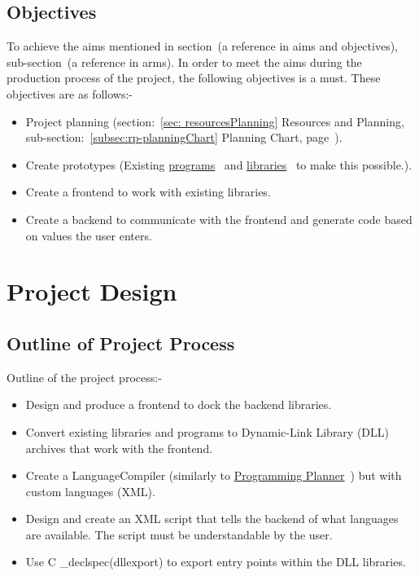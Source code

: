 \documentclass[conference]{IEEEtran}
\begin{document}
      \subsection{Objectives}
        To achieve the aims mentioned in section~(a reference in aims and objectives), sub-section~(a reference in arms). In order to meet the aims during the production process of the project, the following objectives is a must. These objectives are as follows:-
        \begin{itemize}
          \item Project planning (section:~\ref{sec: resourcesPlanning} Resources and Planning, sub-section:~\ref{subsec:rp-planningChart} Planning Chart, page~\pageref{subsec:rp-planningChart}).
          \item Create prototypes (Existing \href{https://github.com/ShinkuKira21/VisualPro-FinalProject/tree/main/Experience}{programs}~\cite{patch_programming_2021} and \href{https://github.com/ShinkuKira21/VisualPro-FinalProject/tree/main/Libraries}{libraries}~\cite{patch_libraries_2021} to make this possible.).
          \item Create a frontend to work with existing libraries.
          \item Create a backend to communicate with the frontend and generate code based on values the user enters.
        \end{itemize}
      
    \section{Project Design}
      \subsection{Outline of Project Process}
        Outline of the project process:-
        \begin{itemize}
          \item Design and produce a frontend to dock the backend libraries.
          \item Convert existing libraries and programs to Dynamic-Link Library (DLL) archives that work with the frontend.
          \item Create a LanguageCompiler (similarly to \href{https://github.com/ShinkuKira21/VisualPro-FinalProject/tree/main/Experience}{Programming Planner}~\cite{patch_programming_2021}) but with custom languages (XML).
          \item Design and create an XML script that tells the backend of what languages are available. The script must be understandable by the user.
          \item Use C \_declspec(dllexport) to export entry points within the DLL libraries.
        \end{itemize}
        
\end{document}
